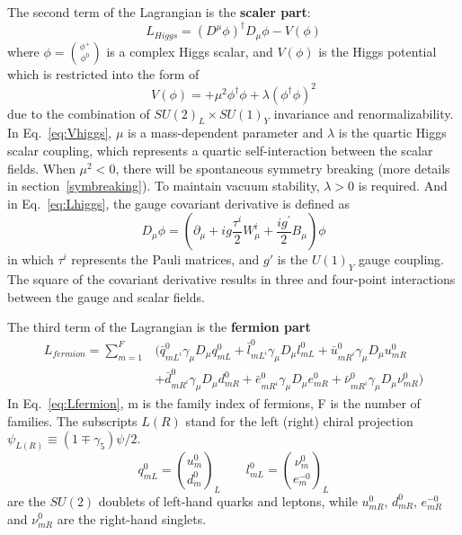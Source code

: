 The second term of the Lagrangian is the \textbf{scaler part}:
\begin{equation} \label{eq:Lhiggs}
	{L}_{Higgs} = \left(D^{\mu}\phi\right)^{\dagger}D_{\mu}\phi - V(\phi)
\end{equation}
where $\phi = \binom{\phi^{+}}{\phi^{0}}$  is a complex Higgs scalar,
and $V(\phi)$ is the Higgs potential which is restricted into the form of 
\begin{equation} \label{eq:Vhiggs}
	V(\phi) = +\mu^{2}\phi^{\dagger}\phi + \lambda\left(\phi^{\dagger}\phi\right)^{2}
\end{equation}
due to the combination of $SU(2)_{L} \times SU(1)_{Y}$ invariance and renormalizability.
In Eq.~\ref{eq:Vhiggs}, $\mu$ is a mass-dependent parameter and $\lambda$ is the quartic Higgs scalar coupling, 
which represents a quartic self-interaction between the scalar fields.
When $\mu^{2} < 0$, there will be spontaneous symmetry breaking (more details in section~\ref{symbreaking}).
To maintain vacuum stability, $\lambda > 0$ is required.
And in Eq.~\ref{eq:Lhiggs}, the gauge covariant derivative is defined as
\begin{equation}
	D_{\mu}\phi = \left(\partial_{\mu} +ig\frac{\tau^{i}}{2}W_{\mu}^{i} + \frac{ig^{'}}{2}B_{\mu}\right)\phi
\end{equation}
in which $\tau^{i}$ represents the Pauli matrices, and $g'$ is the $U(1)_{Y}$ gauge coupling.
The square of the covariant derivative results in three and four-point interactions between the gauge and scalar fields.

The third term of the Lagrangian is the \textbf{fermion part}
\begin{equation} \label{eq:Lfermion}
\begin{split}
  	{L}_{fermion} = \sum_{m=1}^{F} & ( \bar{q}_{mL^{i}}^{0}\gamma_{\mu}D_{\mu}q_{mL}^{0} + \bar{l}_{mL^{i}}^{0}\gamma_{\mu}D_{\mu}l_{mL}^{0} + \bar{u}_{mR^{i}}^{0}\gamma_{\mu}D_{\mu}u_{mR}^{0} \\
  	& + \bar{d}_{mR^{i}}^{0}\gamma_{\mu}D_{\mu}d_{mR}^{0} + \bar{e}_{mR^{i}}^{0}\gamma_{\mu}D_{\mu}e_{mR}^{0} + \bar{\nu}_{mR^{i}}^{0}\gamma_{\mu}D_{\mu}\nu_{mR}^{0})
\end{split}
\end{equation} 
In Eq.~\ref{eq:Lfermion}, m is the family index of fermions, F is the number of families.
The subscripts $L (R)$ stand for the left (right) chiral projection $\psi_{L(R)} \equiv \left(1 \mp \gamma_{5} \right) \psi/2$.
\begin{equation}
	q_{mL}^{0} = \binom{u_{m}^{0}}{d_{m}^{0}}_{L}   \qquad    l_{mL}^{0} = \binom{\nu_{m}^{0}}{e_{m}^{-0}}_{L}
\end{equation}
are the $SU(2)$ doublets of left-hand quarks and leptons, while 
$u_{mR}^{0}$, $d_{mR}^{0}$, $e_{mR}^{-0}$ and $\nu_{mR}^{0}$ are the right-hand singlets.

